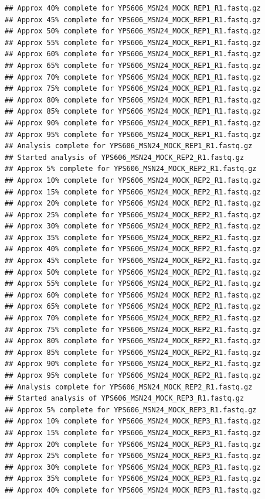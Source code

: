\documentclass[
]{book}
\begin{document}
\begin{verbatim}
## Approx 40% complete for YPS606_MSN24_MOCK_REP1_R1.fastq.gz
## Approx 45% complete for YPS606_MSN24_MOCK_REP1_R1.fastq.gz
## Approx 50% complete for YPS606_MSN24_MOCK_REP1_R1.fastq.gz
## Approx 55% complete for YPS606_MSN24_MOCK_REP1_R1.fastq.gz
## Approx 60% complete for YPS606_MSN24_MOCK_REP1_R1.fastq.gz
## Approx 65% complete for YPS606_MSN24_MOCK_REP1_R1.fastq.gz
## Approx 70% complete for YPS606_MSN24_MOCK_REP1_R1.fastq.gz
## Approx 75% complete for YPS606_MSN24_MOCK_REP1_R1.fastq.gz
## Approx 80% complete for YPS606_MSN24_MOCK_REP1_R1.fastq.gz
## Approx 85% complete for YPS606_MSN24_MOCK_REP1_R1.fastq.gz
## Approx 90% complete for YPS606_MSN24_MOCK_REP1_R1.fastq.gz
## Approx 95% complete for YPS606_MSN24_MOCK_REP1_R1.fastq.gz
## Analysis complete for YPS606_MSN24_MOCK_REP1_R1.fastq.gz
## Started analysis of YPS606_MSN24_MOCK_REP2_R1.fastq.gz
## Approx 5% complete for YPS606_MSN24_MOCK_REP2_R1.fastq.gz
## Approx 10% complete for YPS606_MSN24_MOCK_REP2_R1.fastq.gz
## Approx 15% complete for YPS606_MSN24_MOCK_REP2_R1.fastq.gz
## Approx 20% complete for YPS606_MSN24_MOCK_REP2_R1.fastq.gz
## Approx 25% complete for YPS606_MSN24_MOCK_REP2_R1.fastq.gz
## Approx 30% complete for YPS606_MSN24_MOCK_REP2_R1.fastq.gz
## Approx 35% complete for YPS606_MSN24_MOCK_REP2_R1.fastq.gz
## Approx 40% complete for YPS606_MSN24_MOCK_REP2_R1.fastq.gz
## Approx 45% complete for YPS606_MSN24_MOCK_REP2_R1.fastq.gz
## Approx 50% complete for YPS606_MSN24_MOCK_REP2_R1.fastq.gz
## Approx 55% complete for YPS606_MSN24_MOCK_REP2_R1.fastq.gz
## Approx 60% complete for YPS606_MSN24_MOCK_REP2_R1.fastq.gz
## Approx 65% complete for YPS606_MSN24_MOCK_REP2_R1.fastq.gz
## Approx 70% complete for YPS606_MSN24_MOCK_REP2_R1.fastq.gz
## Approx 75% complete for YPS606_MSN24_MOCK_REP2_R1.fastq.gz
## Approx 80% complete for YPS606_MSN24_MOCK_REP2_R1.fastq.gz
## Approx 85% complete for YPS606_MSN24_MOCK_REP2_R1.fastq.gz
## Approx 90% complete for YPS606_MSN24_MOCK_REP2_R1.fastq.gz
## Approx 95% complete for YPS606_MSN24_MOCK_REP2_R1.fastq.gz
## Analysis complete for YPS606_MSN24_MOCK_REP2_R1.fastq.gz
## Started analysis of YPS606_MSN24_MOCK_REP3_R1.fastq.gz
## Approx 5% complete for YPS606_MSN24_MOCK_REP3_R1.fastq.gz
## Approx 10% complete for YPS606_MSN24_MOCK_REP3_R1.fastq.gz
## Approx 15% complete for YPS606_MSN24_MOCK_REP3_R1.fastq.gz
## Approx 20% complete for YPS606_MSN24_MOCK_REP3_R1.fastq.gz
## Approx 25% complete for YPS606_MSN24_MOCK_REP3_R1.fastq.gz
## Approx 30% complete for YPS606_MSN24_MOCK_REP3_R1.fastq.gz
## Approx 35% complete for YPS606_MSN24_MOCK_REP3_R1.fastq.gz
## Approx 40% complete for YPS606_MSN24_MOCK_REP3_R1.fastq.gz

\end{verbatim}
\end{document}
